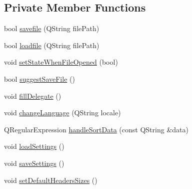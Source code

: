 \subsection*{Private Member Functions}
\begin{DoxyCompactItemize}
\item 
bool \mbox{\hyperlink{class_main_window_ac38843e08bed49b8822d9b979840b2bc}{savefile}} (Q\+String file\+Path)
\item 
bool \mbox{\hyperlink{class_main_window_af86d3fdd62f9df452ddc9193c061ceee}{loadfile}} (Q\+String file\+Path)
\item 
void \mbox{\hyperlink{class_main_window_a342dfaa144e4dbae8d3663d068e65e73}{set\+State\+When\+File\+Opened}} (bool)
\item 
bool \mbox{\hyperlink{class_main_window_a0a1b89e3dba62780bfdeea2e76ffc560}{suggest\+Save\+File}} ()
\item 
void \mbox{\hyperlink{class_main_window_a3daa11e9616a5f65638e98ef3b83919b}{fill\+Delegate}} ()
\item 
void \mbox{\hyperlink{class_main_window_a1edcbfb7d066c4935f26882fa3fa73d6}{change\+Language}} (Q\+String locale)
\item 
Q\+Regular\+Expression \mbox{\hyperlink{class_main_window_a41ae3989f10eb69553361456a3eab9c8}{handle\+Sort\+Data}} (const Q\+String \&data)
\item 
void \mbox{\hyperlink{class_main_window_a9bb1f3b7f6b5360abfd2dc01fc1c8930}{load\+Settings}} ()
\item 
void \mbox{\hyperlink{class_main_window_abb30531afee763d0586ee6323fd332e2}{save\+Settings}} ()
\item 
void \mbox{\hyperlink{class_main_window_ac2946dc391053986a08990439dc21597}{set\+Default\+Headers\+Sizes}} ()
\end{DoxyCompactItemize}
